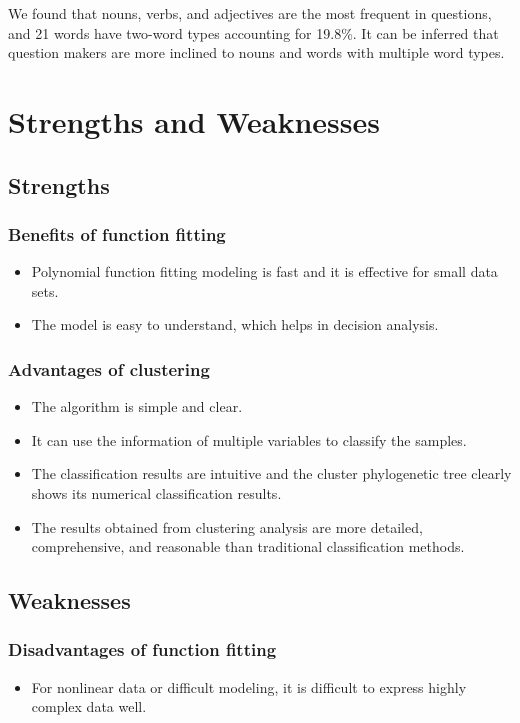 \documentclass[12pt]{article}  %
\begin{document}
 We found that nouns, verbs, and adjectives are the most frequent in questions, and 21 words have two-word types accounting for 19.8\%. It can be inferred that question makers are more inclined to nouns and words with multiple word types.


\section{Strengths and Weaknesses}
\subsection{Strengths}
\subsubsection{Benefits of function fitting}
\begin{itemize}
    \item Polynomial function fitting modeling is fast and it is effective for small data sets.
    \item The model is easy to understand, which helps in decision analysis.
\end{itemize}
\subsubsection{Advantages of clustering}
\begin{itemize}
    \item The algorithm is simple and clear.
    \item It can use the information of multiple variables to classify the samples.
    \item The classification results are intuitive and the cluster phylogenetic tree clearly shows its numerical classification results. 
    \item The results obtained from clustering analysis are more detailed, comprehensive, and reasonable than traditional classification methods.
\end{itemize}

\subsection{Weaknesses}
\subsubsection{Disadvantages of function fitting}
\begin{itemize}
    \item For nonlinear data or difficult modeling, it is difficult to express highly complex data well.
 \end{itemize}
\end{document}
